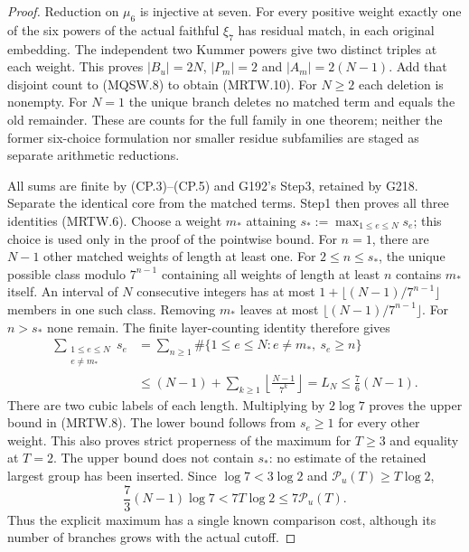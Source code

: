 \begin{proof}
Reduction on $\mu_6$ is injective at seven. For every positive
weight exactly one of the six powers of the actual faithful
$\xi_7$ has residual match, in each original embedding. The
independent two Kummer powers give two distinct triples at each
weight. This proves $|B_u|=2N$, $|P_m|=2$ and $|A_m|=2(N-1)$.
Add that disjoint count to (MQSW.8) to obtain (MRTW.10).
For $N\geq2$ each deletion is nonempty. For $N=1$ the unique
branch deletes no matched term and equals the old remainder.
These are counts for the full family in one theorem; neither
the former six-choice formulation nor smaller residue subfamilies
are staged as separate arithmetic reductions.

All sums are finite by (CP.3)--(CP.5) and G192's Step3, retained
by G218. Separate the identical core from the matched terms.
Step1 then proves all three identities (MRTW.6).
Choose a weight $m_*$ attaining $s_*:=\max_{1\leq e\leq N}s_e$;
this choice is used only in the proof of the pointwise bound.
For $n=1$, there are $N-1$ other matched weights of length at
least one. For $2\leq n\leq s_*$, the unique possible class
modulo $7^{n-1}$ containing all weights of length at least $n$
contains $m_*$ itself. An interval of $N$ consecutive integers
has at most $1+\lfloor(N-1)/7^{n-1}\rfloor$ members in one
such class. Removing $m_*$ leaves at most
$\lfloor(N-1)/7^{n-1}\rfloor$. For $n>s_*$ none remain.
The finite layer-counting identity therefore gives
\[
 \begin{split}
 \sum_{\substack{1\leq e\leq N\\e\ne m_*}}s_e
 &=\sum_{n\geq1}
        \#\{1\leq e\leq N:e\ne m_*,\ s_e\geq n\}\\
 &\leq (N-1)+\sum_{k\geq1}
                      \left\lfloor\frac{N-1}{7^k}\right\rfloor
   =L_N\leq\frac76(N-1).
 \end{split}\tag{MRTW.14}
\]
There are two cubic labels of each length. Multiplying by
$2\log7$ proves the upper bound in (MRTW.8). The lower bound
follows from $s_e\geq1$ for every other weight. This also proves
strict properness of the maximum for $T\geq3$ and equality at
$T=2$. The upper bound does not contain $s_*$: no estimate of
the retained largest group has been inserted.
Since $\log7<3\log2$ and $\mathcal P_u(T)\geq T\log2$,
\[
 \frac73(N-1)\log7<7T\log2\leq7\mathcal P_u(T).
 \tag{MRTW.15}
\]
Thus the explicit maximum has a single known comparison cost,
although its number of branches grows with the actual cutoff.


\end{proof}
